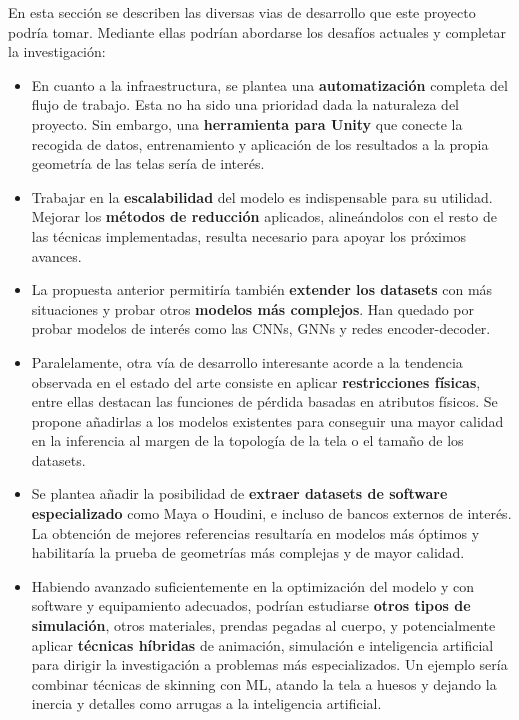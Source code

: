 En esta sección se describen las diversas vias de desarrollo que este proyecto podría tomar. Mediante ellas podrían abordarse los desafíos actuales y completar la investigación:
\begin{itemize}
    \item En cuanto a la infraestructura, se plantea una \textbf{automatización} completa del flujo de trabajo. Esta no ha sido una prioridad dada la naturaleza del proyecto. Sin embargo, una \textbf{herramienta para Unity} que conecte la recogida de datos, entrenamiento y aplicación de los resultados a la propia geometría de las telas sería de interés.
    \item Trabajar en la \textbf{escalabilidad} del modelo es indispensable para su utilidad. Mejorar los \textbf{métodos de reducción} aplicados, alineándolos con el resto de las técnicas implementadas, resulta necesario para apoyar los próximos avances.
    \item La propuesta anterior permitiría también \textbf{extender los datasets} con más situaciones y probar otros \textbf{modelos más complejos}. Han quedado por probar modelos de interés como las CNNs, GNNs y redes encoder-decoder.
    \item Paralelamente, otra vía de desarrollo interesante acorde a la tendencia observada en el estado del arte consiste en aplicar \textbf{restricciones físicas}, entre ellas destacan las funciones de pérdida basadas en atributos físicos. Se propone añadirlas a los modelos existentes para conseguir una mayor calidad en la inferencia al margen de la topología de la tela o el tamaño de los datasets.
    \item Se plantea añadir la posibilidad de \textbf{extraer datasets de software especializado} como Maya o Houdini, e incluso de bancos externos de interés. La obtención de mejores referencias resultaría en modelos más óptimos y habilitaría la prueba de geometrías más complejas y de mayor calidad.
    \item Habiendo avanzado suficientemente en la optimización del modelo y con software y equipamiento adecuados, podrían estudiarse \textbf{otros tipos de simulación}, otros materiales, prendas pegadas al cuerpo, y potencialmente aplicar \textbf{técnicas híbridas} de animación, simulación e inteligencia artificial para dirigir la investigación a problemas más especializados. Un ejemplo sería combinar técnicas de skinning con ML, atando la tela a huesos y dejando la inercia y detalles como arrugas a la inteligencia artificial.
\end{itemize}